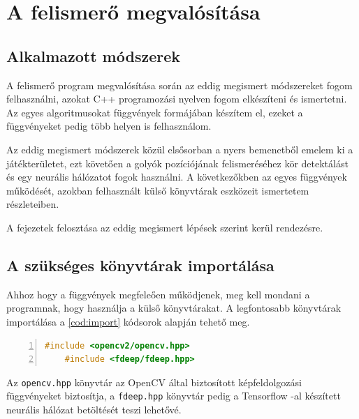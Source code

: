 \renewcommand{\lstlistingname}{kódrészlet}

\chapter{A felismerő megvalósítása}
\section{Alkalmazott módszerek}
A felismerő program megvalósítása során az eddig megismert módszereket fogom felhasználni, azokat C++ programozási nyelven fogom elkészíteni és ismertetni. Az egyes algoritmusokat függvények formájában készítem el, ezeket a függvényeket pedig több helyen is felhasználom.
\par Az eddig megismert módszerek közül elsősorban a nyers bemenetből emelem ki a játékterületet, ezt követően a golyók pozíciójának felismeréséhez kör detektálást és egy neurális hálózatot fogok használni. A következőkben az egyes függvények működését, azokban felhasznált külső könyvtárak eszközeit ismertetem részleteiben.
\par A fejezetek felosztása az eddig megismert lépések szerint kerül rendezésre.

\section{A szükséges könyvtárak importálása}
Ahhoz hogy a függvények megfeleően működjenek, meg kell mondani a programnak, hogy használja a külső könyvtárakat.
\newline A legfontosabb könyvtárak importálása a \ref{cod:import} kódsorok alapján tehető meg.

\begin{codewrapper}
\begin{lstlisting}[language=C++, numbers=left, caption={Könyvtárak importálása.}, label={cod:import}]
    #include <opencv2/opencv.hpp>
    #include <fdeep/fdeep.hpp>
\end{lstlisting}
\end{codewrapper}

\par Az \lstinline{opencv.hpp} könyvtár az OpenCV által biztosított képfeldolgozási függvényeket biztosítja, a \lstinline{fdeep.hpp} könyvtár pedig a Tensorflow -al készített neurális hálózat betöltését teszi lehetővé.

